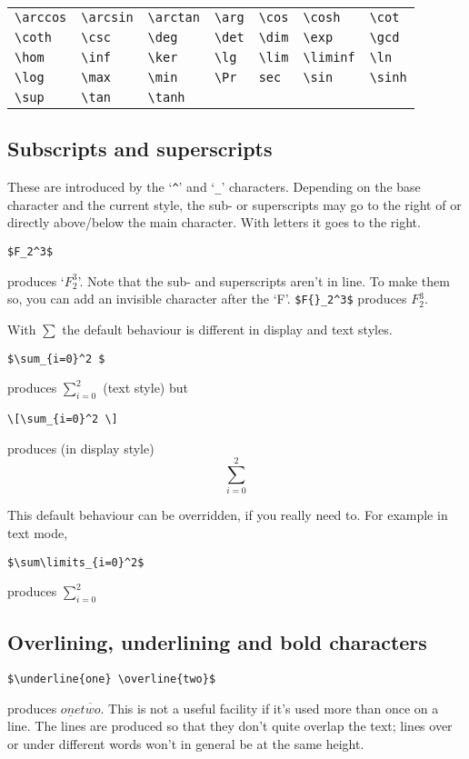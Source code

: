 \documentclass[dvips]{article}
\begin{document}
\begin{tabular}{lllllll}
\verb|\arccos|& \verb|\arcsin|& \verb|\arctan|& \verb|\arg|& \verb|\cos| & 
\verb|\cosh|& \verb|\cot|\\
\verb|\coth|& \verb|\csc|& \verb|\deg|& 
\verb|\det|& \verb|\dim|& \verb|\exp|& \verb|\gcd|\\
\verb|\hom| & \verb|\inf|& \verb|\ker|& \verb|\lg|& \verb|\lim|&
\verb|\liminf|& \verb|\ln|\\
\verb|\log| & \verb|\max|& \verb|\min|& \verb|\Pr|&
\verb|sec|& \verb|\sin|& \verb|\sinh|\\
 \verb|\sup|& \verb|\tan| & \verb|\tanh| & & &  &\\    
\end{tabular}



\subsection{Subscripts and superscripts}
These are introduced by the `\verb|^|' and `\verb|_|' characters.
Depending on the base character and the current style, the sub- or 
superscripts may go to the right of or directly above/below the main 
character.
With letters it goes to the right.
\begin{verbatim}
$F_2^3$
\end{verbatim}
produces `$F_2^3$'. Note that the sub- and superscripts aren't in line.
To make them so, you can add an invisible character after the `F'. 
\verb|$F{}_2^3$| produces $F{}_2^3$.

With $\sum$ the default behaviour is different in display and
text styles.

\begin{verbatim}
$\sum_{i=0}^2 $ 
\end{verbatim}
produces $\sum_{i=0}^2 $ (text style) but 
\begin{verbatim}
\[\sum_{i=0}^2 \] 
\end{verbatim}
produces (in display style) \[\sum_{i=0}^2 \] 

This default behaviour can be overridden, if you really need
to. For example in text mode,
\begin{verbatim}
$\sum\limits_{i=0}^2$ 
\end{verbatim}
produces $\sum\limits_{i=0}^2$

\subsection{Overlining, underlining and bold characters}
\begin{verbatim}
$\underline{one} \overline{two}$ 
\end{verbatim}
produces $\underline{one} \overline{two}$. This is not a 
useful facility if it's used more than once on a line. The lines are
produced so that they don't quite overlap the text; lines over or 
under different words won't in general be at the same height. 
\end{document}
